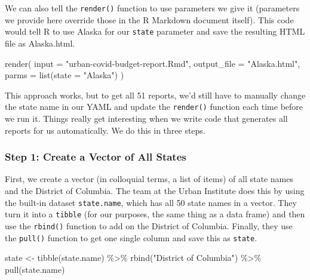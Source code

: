 \documentclass[
]{book}
\newenvironment{Shaded}{\begin{snugshade}}{\end{snugshade}}
\newcommand{\AttributeTok}[1]{\textcolor[rgb]{0.77,0.63,0.00}{#1}}
\newcommand{\FunctionTok}[1]{\textcolor[rgb]{0.00,0.00,0.00}{#1}}
\newcommand{\NormalTok}[1]{#1}
\newcommand{\OtherTok}[1]{\textcolor[rgb]{0.56,0.35,0.01}{#1}}
\newcommand{\SpecialCharTok}[1]{\textcolor[rgb]{0.00,0.00,0.00}{#1}}
\newcommand{\StringTok}[1]{\textcolor[rgb]{0.31,0.60,0.02}{#1}}
\begin{document}
We can also tell the \texttt{render()} function to use parameters we give it (parameters we provide here override those in the R Markdown document itself). This code would tell R to use Alaska for our \texttt{state} parameter and save the resulting HTML file as Alaska.html.

\begin{Shaded}
\begin{Highlighting}[]
\FunctionTok{render}\NormalTok{(}
\AttributeTok{input =} \StringTok{"urban{-}covid{-}budget{-}report.Rmd"}\NormalTok{,}
\AttributeTok{output\_file =} \StringTok{"Alaska.html"}\NormalTok{,}
\AttributeTok{parms =} \FunctionTok{list}\NormalTok{(}\AttributeTok{state =} \StringTok{"Alaska"}\NormalTok{)}
\NormalTok{)}
\end{Highlighting}
\end{Shaded}

This approach works, but to get all 51 reports, we'd still have to manually change the state name in our YAML and update the \texttt{render()} function each time before we run it. Things really get interesting when we write code that generates all reports for us automatically. We do this in three steps.

\hypertarget{step-1-create-a-vector-of-all-states}{%
\subsubsection*{Step 1: Create a Vector of All States}\label{step-1-create-a-vector-of-all-states}}

First, we create a vector (in colloquial terms, a list of items) of all state names and the District of Columbia. The team at the Urban Institute does this by using the built-in dataset \texttt{state.name}, which has all 50 state names in a vector. They turn it into a \texttt{tibble} (for our purposes, the same thing as a data frame) and then use the \texttt{rbind()} function to add on the District of Columbia. Finally, they use the \texttt{pull()} function to get one single column and save this as \texttt{state}.

\begin{Shaded}
\begin{Highlighting}[]
\NormalTok{state }\OtherTok{\textless{}{-}} \FunctionTok{tibble}\NormalTok{(state.name) }\SpecialCharTok{\%\textgreater{}\%}
\FunctionTok{rbind}\NormalTok{(}\StringTok{"District of Columbia"}\NormalTok{) }\SpecialCharTok{\%\textgreater{}\%}
\FunctionTok{pull}\NormalTok{(state.name)}
\end{Highlighting}
\end{Shaded}
\end{document}

